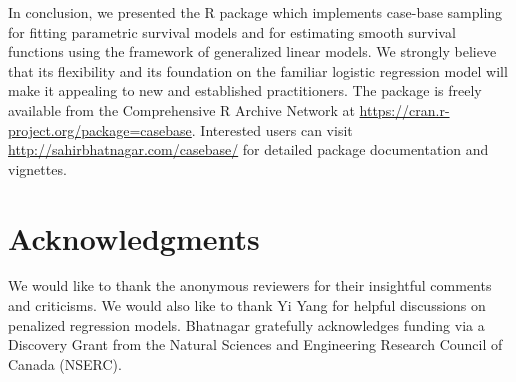 In conclusion, we presented the R package  which
implements case-base sampling for fitting parametric survival models and
for estimating smooth survival functions using the framework of
generalized linear models. We strongly believe that its flexibility and
its foundation on the familiar logistic regression model will make it
appealing to new and established practitioners. The 
package is freely available from the Comprehensive R Archive Network at
\url{https://cran.r-project.org/package=casebase}. Interested users can
visit \url{http://sahirbhatnagar.com/casebase/} for detailed package
documentation and vignettes.

\hypertarget{acknowledgments}{%
\section{Acknowledgments}\label{acknowledgments}}

We would like to thank the anonymous reviewers for their insightful
comments and criticisms. We would also like to thank Yi Yang for helpful
discussions on penalized regression models. \mbox{Bhatnagar} gratefully
acknowledges funding via a Discovery Grant from the Natural Sciences and
Engineering Research Council of Canada (NSERC).



\address{%
Sahir Rai Bhatnagar*\\
McGill University\\%
1020 Pine Avenue West Montreal, QC, Canada H3A 1A2\\
%
\url{http://sahirbhatnagar.com/}%
%
\\
}

\address{%
Maxime Turgeon*\\
University of Manitoba\\%
186 Dysart Road Winnipeg, MB, Canada R3T 2N2\\
%
\url{https://maxturgeon.ca/}%
%
\\
}

\address{%
Jesse Islam\\
McGill University\\%
1020 Pine Avenue West Montreal, QC, Canada H3A 1A2\\
%
%
%
\\
}

\address{%
James A. Hanley\\
McGill University\\%
1020 Pine Avenue West Montreal, QC, Canada H3A 1A2\\
%
\url{http://www.medicine.mcgill.ca/epidemiology/hanley/}%
%
\\
}

\address{%
Olli Saarela\\
University of Toronto\\%
Dalla Lana School of Public Health, 155 College Street, 6th floor,
Toronto, Ontario M5T 3M7, Canada\\
%
\url{http://individual.utoronto.ca/osaarela/}%
%
\\
}
